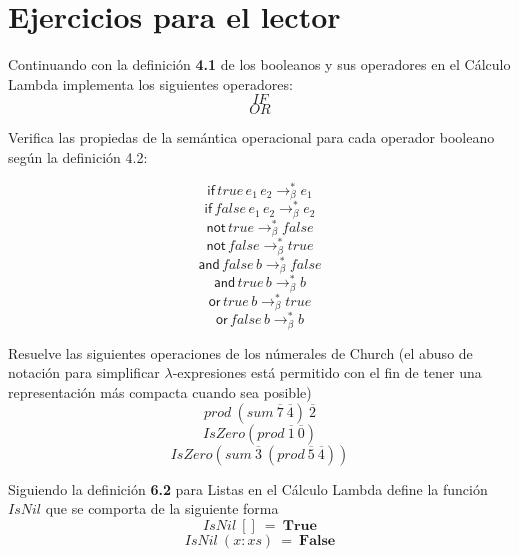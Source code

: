                     \newpage

            \section{Ejercicios para el lector}

                \begin{exercise}
                    Continuando con la definición \textbf{4.1} de los booleanos y sus operadores en el Cálculo Lambda implementa los siguientes operadores:
                    \[IF\]
                    \[OR\]
                \end{exercise}

                \begin{exercise}
                    Verifica las propiedas de la semántica operacional para cada operador booleano según la definición 4.2:

                        $$\mathsf{if}\,true\,e_1\,e_2 \to_\beta^* e_1$$ 
                        $$\mathsf{if}\,false\,e_1\,e_2 \to_\beta^* e_2$$ 
                        $$\mathsf{not}\,true\to_\beta^* false$$
                        $$\mathsf{not}\,false\to_\beta^* true$$
                        $$\mathsf{and}\,false\,b\to_\beta^* false$$
                        $$\mathsf{and}\,true\,b\to_\beta^* b$$
                        $$\mathsf{or}\,true\,b\to_\beta^* true$$
                        $$\mathsf{or}\,false\,b\to_\beta^* b$$
                        
                \end{exercise}


                \begin{exercise}
                    Resuelve las siguientes operaciones de los númerales de Church (el abuso de notación para simplificar $\lambda$-expresiones está permitido con el fin de tener una representación más compacta cuando sea posible)
                    \[
                            prod\ (sum\ \overline{7}\ \overline{4})\ \overline{2}
                    \]
                    \[
                            IsZero (prod\ \overline{1}\ \overline{0})
                    \]
                    \[
                            IsZero( sum\ \overline{3}\ (prod\ \overline{5}\ \overline{4}))
                    \]
                \end{exercise}  

                \begin{exercise}
                    Siguiendo la definición \textbf{6.2} para Listas en el Cálculo Lambda define la función $IsNil$ que se comporta de la siguiente forma
                    \[ IsNil\ []\ =\ \textbf{True} \]
                    \[ IsNil\ (x:xs)\  =\ \textbf{False}\]
                \end{exercise}

